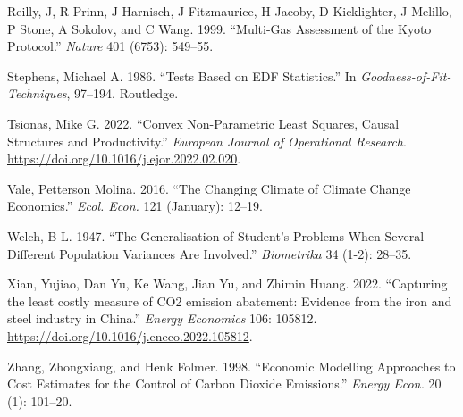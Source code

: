 \documentclass[
  letterpaper,
  DIV=11,
  numbers=noendperiod]{scrartcl}
\newlength{\cslhangindent}
\newlength{\cslentryspacingunit} %
\newenvironment{CSLReferences}[2] %
 {%
  \setlength{\parindent}{0pt}
  \ifodd #1
  \let\oldpar\par
  \def\par{\hangindent=\cslhangindent\oldpar}
  \fi
  \setlength{\parskip}{#2\cslentryspacingunit}
 }%
 {}
\begin{document}
\begin{CSLReferences}{1}{0}
\leavevmode{}%
Reilly, J, R Prinn, J Harnisch, J Fitzmaurice, H Jacoby, D Kicklighter,
J Melillo, P Stone, A Sokolov, and C Wang. 1999. {``Multi-Gas Assessment
of the Kyoto Protocol.''} \emph{Nature} 401 (6753): 549--55.

\leavevmode{}%
Stephens, Michael A. 1986. {``Tests Based on {EDF} Statistics.''} In
\emph{Goodness-of-Fit-Techniques}, 97--194. Routledge.

\leavevmode{}%
Tsionas, Mike G. 2022. {``{Convex Non-Parametric Least Squares, Causal
Structures and Productivity}.''} \emph{European Journal of Operational
Research}. \url{https://doi.org/10.1016/j.ejor.2022.02.020}.

\leavevmode{}%
Vale, Petterson Molina. 2016. {``The Changing Climate of Climate Change
Economics.''} \emph{Ecol. Econ.} 121 (January): 12--19.

\leavevmode{}%
Welch, B L. 1947. {``The Generalisation of Student's Problems When
Several Different Population Variances Are Involved.''}
\emph{Biometrika} 34 (1-2): 28--35.

\leavevmode{}%
Xian, Yujiao, Dan Yu, Ke Wang, Jian Yu, and Zhimin Huang. 2022.
{``{Capturing the least costly measure of CO2 emission abatement:
Evidence from the iron and steel industry in China}.''} \emph{Energy
Economics} 106: 105812.
\url{https://doi.org/10.1016/j.eneco.2022.105812}.

\leavevmode{}%
Zhang, Zhongxiang, and Henk Folmer. 1998. {``Economic Modelling
Approaches to Cost Estimates for the Control of Carbon Dioxide
Emissions.''} \emph{Energy Econ.} 20 (1): 101--20.

\end{CSLReferences}
\end{document}
